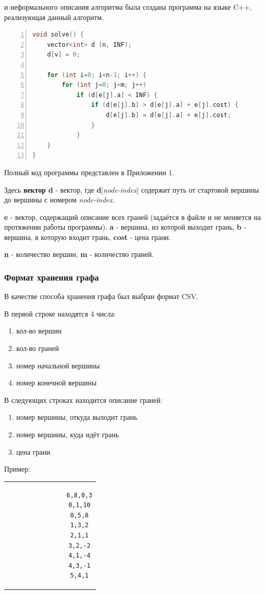 \documentclass[utf8x, 14pt]{article}
\begin{document}
и неформального описания алгоритма\cite{algo} была создана программа на языке C++, реализующая данный алгоритм.
\newpage
\begin{lstlisting}[language=C++, numbers=left, frame=single]
void solve() {
	vector<int> d (n, INF);
	d[v] = 0;

	for (int i=0; i<n-1; i++) {
		for (int j=0; j<m; j++)
			if (d[e[j].a] < INF) {
				if (d[e[j].b] > d[e[j].a] + e[j].cost) {
					d[e[j].b] = d[e[j].a] + e[j].cost;
				}
			}
	}
}
\end{lstlisting}

Полный код программы представлен в Приложении 1.

Здесь \textbf{вектор d} - вектор, где \textbf{d}[\textit{node-index}] содержит путь от стартовой вершины до вершины с номером \textit{node-index}.

\textbf{e} - вектор, содержащий описание всех граней (задаётся в файле и не меняется на протяжении работы программы). \textbf{a} - вершина, из которой выходит грань, \textbf{b} - вершина, в которую входит грань, \textbf{cost} - цена грани.

\textbf{n} - количество вершин, \textbf{m} - количество граней.

\subsubsection{Формат хранения графа}
В качестве способа хранения графа был выбран формат CSV.

В первой строке находятся 4 числа:
\begin{enumerate}
	\item кол-во вершин
	\item кол-во граней
	\item номер начальной вершины
	\item номер конечной вершины
\end{enumerate}

В следующих строках находится описание граней:
\begin{enumerate}
	\item номер вершины, откуда выходит грань
	\item номер вершины, куда идёт грань
	\item цена грани
\end{enumerate}

Пример:

\begin{tabular}{c}
	\begin{lstlisting}
				6,8,0,3
				0,1,10
				0,5,8
				1,3,2
				2,1,1
				3,2,-2
				4,1,-4
				4,3,-1
				5,4,1
	\end{lstlisting}
\end{tabular}
\end{document}

